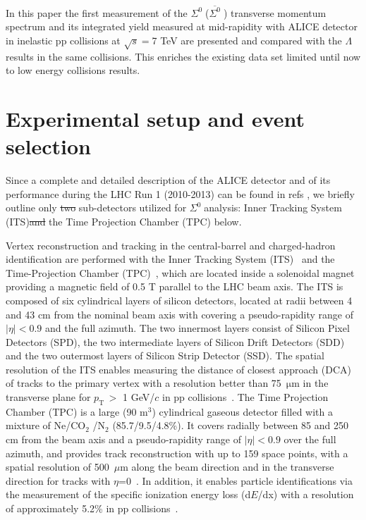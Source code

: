 \documentclass[ALICE,manyauthors]{cernphprep}
\newcommand{\sig}{\ensuremath{\Sigma^0  \; }}
\newcommand{\asig}{\ensuremath{\overline{\Sigma^0} \; }}
\newcommand{\lam}{\ensuremath{\Lambda \; }}
\newcommand{\pt}{\ensuremath{p_{\mathrm{T}\; }}}
\providecommand{\DIFaddtex}[1]{{\protect\color{blue}\uwave{#1}}} %
\providecommand{\DIFdeltex}[1]{{\protect\color{red}\sout{#1}}}                      %
\providecommand{\DIFaddbegin}{} %
\providecommand{\DIFaddend}{} %
\providecommand{\DIFdelbegin}{} %
\providecommand{\DIFdelend}{} %
\providecommand{\DIFadd}[1]{\texorpdfstring{\DIFaddtex{#1}}{#1}} %
\providecommand{\DIFdel}[1]{\texorpdfstring{\DIFdeltex{#1}}{}} %
\begin{document}
In this paper the first measurement of the \sig (\asig) transverse momentum spectrum and its integrated yield measured 
at mid-rapidity with ALICE detector in inelastic pp collisions at $\sqrt{s} =$7 TeV are presented and compared
with the \lam results in the same collisions. This enriches the existing data set limited until now to low energy collisions results. 

 \section{ Experimental setup and event selection}
 \label{sec:exp}

Since a complete and detailed description of the ALICE detector and of its performance 
 during the LHC Run 1 (2010-2013) can be found in refs \cite{cite:ALICE,cite:ALICEPerformance}, 
 we briefly outline only \DIFdelbegin \DIFdel{two }\DIFdelend \DIFaddbegin \DIFadd{the }\DIFaddend sub-detectors utilized for \sig analysis:
Inner Tracking System (ITS)\DIFdelbegin \DIFdel{and }\DIFdelend \DIFaddbegin \DIFadd{, }\DIFaddend the Time Projection Chamber (TPC) \DIFaddbegin \DIFadd{and the VZERO-trigger detectors }\DIFaddend below. 

Vertex reconstruction and tracking in the central-barrel  and charged-hadron identification are performed with the
Inner Tracking System (ITS)~\cite{cite:ALICE} and the Time-Projection Chamber (TPC)~\cite{cite:TPC}, 
which are located inside a solenoidal magnet providing a magnetic field of 0.5 T parallel to the LHC beam axis. 
The ITS is composed of six cylindrical layers of silicon detectors, located at radii between 4 and 43 cm from
the nominal beam axis with covering a pseudo-rapidity range of $|\eta|<0.9$ and the full azimuth. The two innermost layers
consist of Silicon Pixel Detectors (SPD), the two intermediate layers of Silicon Drift Detectors (SDD) and the two outermost
layers of Silicon Strip Detector (SSD). The spatial resolution of the ITS enables measuring the distance of closest approach 
(DCA) of tracks to the primary vertex with a resolution better than 75~$\mathrm{\mu}$m in the transverse plane for \pt $>$ 
1 GeV/$c$ in pp collisions~\cite{cite:Xi_c}. 
The Time Projection Chamber (TPC) is a large (90 m$^3$)
cylindrical gaseous detector filled with a mixture of Ne/CO$_2$ /N$_2$ (85.7/9.5/4.8\%). It covers radially between 85 and 250 cm from the 
beam axis and a pseudo-rapidity range of $|\eta| < 0.9$ over the full azimuth, and provides track reconstruction with up to 
159 space points, with a spatial resolution of 500~$\mu$m along the beam direction and in the transverse direction for tracks 
with $\eta$=0~\cite{cite:TPC}. In addition, it enables particle identifications via the measurement of the specific 
ionization energy loss (d$E$/dx) with a resolution of approximately 5.2\% in pp collisions~\cite{cite:ALICEPerformance}.
\end{document}
